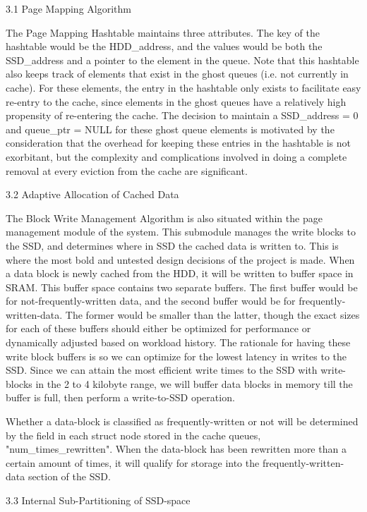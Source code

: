 \documentclass[11pt]{article}
\begin{document}
3.1 Page Mapping Algorithm

The Page Mapping Hashtable maintains three attributes. The key of the hashtable would be the HDD_address, and the values would be both the SSD_address and a pointer to the element in the queue. Note that this hashtable also keeps track of elements that exist in the ghost queues (i.e. not currently in cache). For these elements, the entry in the hashtable only exists to facilitate easy re-entry to the cache, since elements in the ghost queues have a relatively high propensity of re-entering the cache. The decision to maintain a SSD_address = 0 and queue_ptr = NULL for these ghost queue elements is motivated by the consideration that the overhead for keeping these entries in the hashtable is not exorbitant, but the complexity and complications involved in doing a complete removal at every eviction from the cache are significant.

3.2 Adaptive Allocation of Cached Data

The Block Write Management Algorithm is also situated within the page management module of the system. This submodule manages the write blocks to the SSD, and determines where in SSD the cached data is written to. This is where the most bold and untested design decisions of the project is made. When a data block is newly cached from the HDD, it will be written to buffer space in SRAM. This buffer space contains two separate buffers. The first buffer would be for not-frequently-written data, and the second buffer would be for frequently-written-data. The former would be smaller than the latter, though the exact sizes for each of these buffers should either be optimized for performance or dynamically adjusted based on workload history. The rationale for having these write block buffers is so we can optimize for the lowest latency in writes to the SSD. Since we can attain the most efficient write times to the SSD with write-blocks in the 2 to 4 kilobyte range, we will buffer data blocks in memory till the buffer is full, then perform a write-to-SSD operation. 

Whether a data-block is classified as frequently-written or not will be determined by the field in each struct node stored in the cache queues, "num_times_rewritten". When the data-block has been rewritten more than a certain amount of times, it will qualify for storage into the frequently-written-data section of the SSD. 

3.3 Internal Sub-Partitioning of SSD-space
\end{document}
